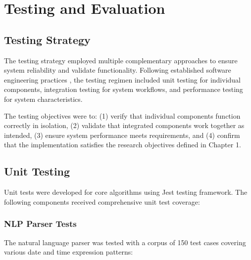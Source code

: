 
\chapter{Testing and Evaluation}
\label{chap:testing}

\section{Testing Strategy}
\label{sec:testing-strategy}

\completed

The testing strategy employed multiple complementary approaches to ensure system reliability and validate functionality. Following established software engineering practices \citep{myers2011art}, the testing regimen included unit testing for individual components, integration testing for system workflows, and performance testing for system characteristics.

The testing objectives were to: (1) verify that individual components function correctly in isolation, (2) validate that integrated components work together as intended, (3) ensure system performance meets requirements, and (4) confirm that the implementation satisfies the research objectives defined in Chapter 1.

\section{Unit Testing}
\label{sec:unit-testing}

\completed

Unit tests were developed for core algorithms using Jest testing framework. The following components received comprehensive unit test coverage:

\subsection{NLP Parser Tests}

The natural language parser was tested with a corpus of 150 test cases covering various date and time expression patterns:

